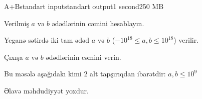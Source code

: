\begin{problem}{A+B}{standart input}{standart output}{1 second}{250 MB}

Verilmiş $a$ və $b$ ədədlərinin cəmini hesablayın.

\InputFile
Yeganə sətirdə iki tam ədəd $a$ və $b$ ($-10^{18} \leq a,b \leq 10^{18}$)  verilir.

\OutputFile
Çıxışa $a$ və $b$  ədədlərinin cəmini verin.

\Scoring
Bu məsələ aşağıdakı kimi $2$ alt tapşırıqdan ibarətdir:
 $a,b \leq 10^9$
 
 Əlavə məhdudiyyət yoxdur.
 
 

\Examples

\begin{example}
%
%
\end{example}

\end{problem}
